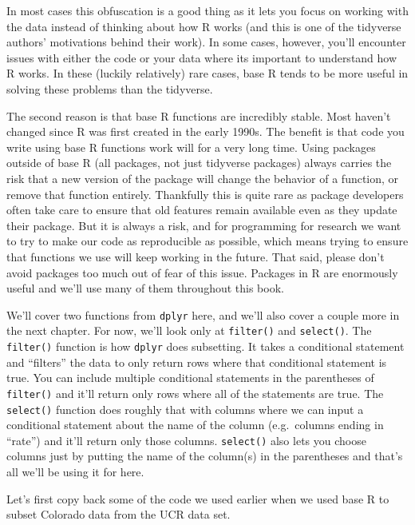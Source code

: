 \documentclass[
]{krantz}
\begin{document}
In most cases this obfuscation is a good thing as it lets
you focus on working with the data instead of thinking about
how R works (and this is one of the tidyverse authors'
motivations behind their work). In some cases, however,
you'll encounter issues with either the code or your data
where its important to understand how R works. In these
(luckily relatively) rare cases, base R tends to be more
useful in solving these problems than the tidyverse.

The second reason is that base R functions are incredibly
stable. Most haven't changed since R was first created in
the early 1990s. The benefit is that code you write using
base R functions work will for a very long time. Using
packages outside of base R (all packages, not just tidyverse
packages) always carries the risk that a new version of the
package will change the behavior of a function, or remove
that function entirely. Thankfully this is quite rare as
package developers often take care to ensure that old
features remain available even as they update their package.
But it is always a risk, and for programming for research we
want to try to make our code as reproducible as possible,
which means trying to ensure that functions we use will keep
working in the future. That said, please don't avoid
packages too much out of fear of this issue. Packages in R
are enormously useful and we'll use many of them throughout
this book.

We'll cover two functions from \texttt{dplyr} here, and
we'll also cover a couple more in the next chapter. For now,
we'll look only at \texttt{filter()} and \texttt{select()}.
The \texttt{filter()} function is how \texttt{dplyr} does
subsetting. It takes a conditional statement and ``filters''
the data to only return rows where that conditional
statement is true. You can include multiple conditional
statements in the parentheses of \texttt{filter()} and it'll
return only rows where all of the statements are true. The
\texttt{select()} function does roughly that with columns
where we can input a conditional statement about the name of
the column (e.g.~columns ending in ``rate'') and it'll
return only those columns. \texttt{select()} also lets you
choose columns just by putting the name of the column(s) in
the parentheses and that's all we'll be using it for here.

Let's first copy back some of the code we used earlier when
we used base R to subset Colorado data from the UCR data
set.
\end{document}

